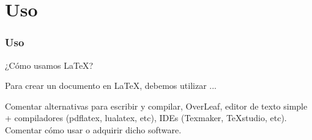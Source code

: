 \section{Uso}\label{sec:uso}

\begin{frame}
\frametitle{Uso}
    \begin{tcolorbox}[colframe=color1]
        \begin{center}
            ¿Cómo usamos \LaTeX ?
        \end{center}
    \end{tcolorbox}

    Para crear un documento en \LaTeX, debemos utilizar ...
    
    Comentar alternativas para escribir y compilar, OverLeaf, editor de texto simple + compiladores (pdflatex, lualatex, etc), IDEs (Texmaker, TeXstudio, etc). Comentar cómo usar o adquirir dicho software.
    
\end{frame}